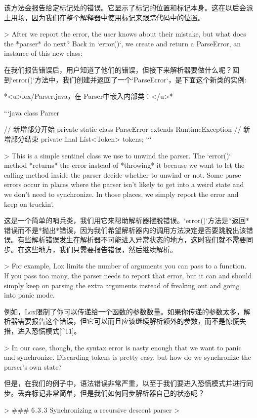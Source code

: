 \documentclass[cn,11pt,chinese]{elegantbook}
\begin{document}
该方法会报告给定标记处的错误。它显示了标记的位置和标记本身。这在以后会派上用场，因为我们在整个解释器中使用标记来跟踪代码中的位置。

> After we report the error, the user knows about their mistake, but what does the *parser* do next? Back in `error()`, we create and return a ParseError, an instance of this new class:

在我们报告错误后，用户知道了他们的错误，但接下来解析器要做什么呢？回到`error()`方法中，我们创建并返回了一个`ParseError`，是下面这个新类的实例:

*<u>lox/Parser.java，在 Parser中嵌入内部类：</u>*

```java
class Parser {  
  // 新增部分开始
	private static class ParseError extends RuntimeException {}
  // 新增部分结束
  private final List<Token> tokens;
```

> This is a simple sentinel class we use to unwind the parser. The `error()` method *returns* the error instead of *throwing* it because we want to let the calling method inside the parser decide whether to unwind or not. Some parse errors occur in places where the parser isn’t likely to get into a weird state and we don’t need to synchronize. In those places, we simply report the error and keep on truckin’.

这是一个简单的哨兵类，我们用它来帮助解析器摆脱错误。`error()`方法是*返回*错误而不是*抛出*错误，因为我们希望解析器内的调用方法决定是否要跳脱出该错误。有些解析错误发生在解析器不可能进入异常状态的地方，这时我们就不需要同步。在这些地方，我们只需要报告错误，然后继续解析。

> For example, Lox limits the number of arguments you can pass to a function. If you pass too many, the parser needs to report that error, but it can and should simply keep on parsing the extra arguments instead of freaking out and going into panic mode.

例如，Lox限制了你可以传递给一个函数的参数数量。如果你传递的参数太多，解析器需要报告这个错误，但它可以而且应该继续解析额外的参数，而不是惊慌失措，进入恐慌模式[^11]。

> In our case, though, the syntax error is nasty enough that we want to panic and synchronize. Discarding tokens is pretty easy, but how do we synchronize the parser’s own state?

但是，在我们的例子中，语法错误非常严重，以至于我们要进入恐慌模式并进行同步。丢弃标记非常简单，但是我们如何同步解析器自己的状态呢？

> ### 6 . 3 . 3 Synchronizing a recursive descent parser
>

}
\end{document}
